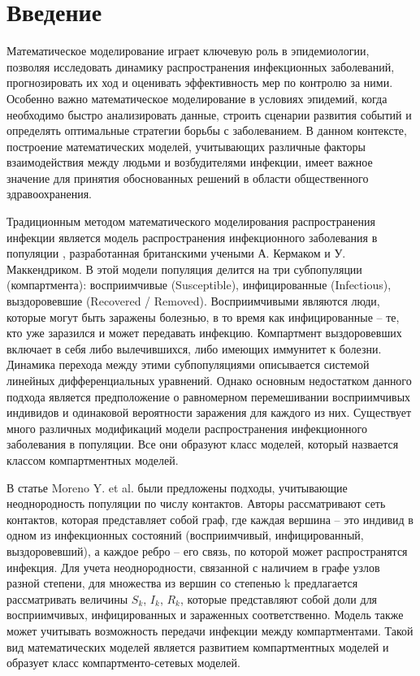 \documentclass[14pt,a4paper]{article}
\begin{document}


\newpage
\tableofcontents

\newpage
\section{Введение}

Математическое моделирование играет ключевую роль в эпидемиологии, позволяя исследовать динамику распространения инфекционных заболеваний, прогнозировать их ход и оценивать эффективность мер по контролю за ними. Особенно важно математическое моделирование в условиях эпидемий, когда необходимо быстро анализировать данные, строить сценарии развития событий и определять оптимальные стратегии борьбы с заболеванием. В данном контексте, построение математических моделей, учитывающих различные факторы взаимодействия между людьми и возбудителями инфекции, имеет важное значение для принятия обоснованных решений в области общественного здравоохранения.


Традиционным методом математического моделирования распространения инфекции является модель распространения инфекционного заболевания в популяции \cite{Murray}, разработанная британскими учеными А. Кермаком и У. Маккендриком. В этой модели популяция делится на три субпопуляции (компартмента): восприимчивые (Susceptible), инфицированные (Infectious), выздоровевшие (Recovered / Removed). Восприимчивыми являются люди, которые могут быть заражены болезнью, в то время как инфицированные -- те, кто уже заразился и может передавать инфекцию. Компартмент выздоровевших включает в себя либо вылечившихся, либо имеющих иммунитет к болезни. Динамика перехода между этими субпопуляциями описывается системой линейных дифференциальных уравнений. Однако основным недостатком данного подхода является предположение о равномерном перемешивании восприимчивых индивидов и одинаковой вероятности заражения для каждого из них. Существует много различных модификаций модели распространения инфекционного заболевания в популяции. Все
они образуют класс моделей, который назвается классом компартментных моделей.
 
В статье  Moreno Y. et al. \cite{Moreno} были предложены подходы, учитывающие неоднородность популяции по числу контактов. Авторы рассматривают сеть контактов, которая представляет собой граф, где каждая вершина -- это индивид в одном из инфекционных состояний (восприимчивый, инфицированный, выздоровевший), а каждое ребро -- его связь, по которой может распространятся инфекция. Для учета неоднородности, связанной с наличием в графе узлов разной степени, для множества из вершин со степенью k предлагается рассматривать величины $S_k$, $I_k$, $R_k$, которые представляют собой доли для восприимчивых, инфицированных и зараженных соответственно. Модель также может учитывать возможность передачи инфекции между компартментами.  
Такой вид математических моделей является развитием компартментных моделей и образует класс компартменто-сетевых моделей.
\end{document}
